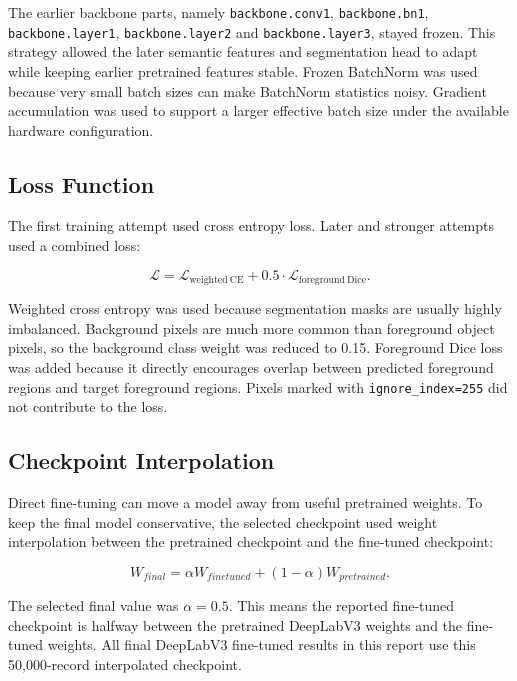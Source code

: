 \documentclass[9pt,a4paper,oneside]{rho-class/rho}
\begin{document}
    The earlier backbone parts, namely \texttt{backbone.conv1}, \texttt{backbone.bn1}, \texttt{backbone.layer1}, \texttt{backbone.layer2} and \texttt{backbone.layer3}, stayed frozen. This strategy allowed the later semantic features and segmentation head to adapt while keeping earlier pretrained features stable. Frozen BatchNorm was used because very small batch sizes can make BatchNorm statistics noisy. Gradient accumulation was used to support a larger effective batch size under the available hardware configuration.

\subsection{Loss Function}

    The first training attempt used cross entropy loss. Later and stronger attempts used a combined loss:

    \begin{equation}
        \mathcal{L} = \mathcal{L}_{\mathrm{weighted\ CE}} + 0.5 \cdot \mathcal{L}_{\mathrm{foreground\ Dice}}.
        \label{eq:loss}
    \end{equation}

    Weighted cross entropy was used because segmentation masks are usually highly imbalanced. Background pixels are much more common than foreground object pixels, so the background class weight was reduced to 0.15. Foreground Dice loss was added because it directly encourages overlap between predicted foreground regions and target foreground regions. Pixels marked with \texttt{ignore\_index=255} did not contribute to the loss.

\subsection{Checkpoint Interpolation}

    Direct fine-tuning can move a model away from useful pretrained weights. To keep the final model conservative, the selected checkpoint used weight interpolation between the pretrained checkpoint and the fine-tuned checkpoint:

    \begin{equation}
        W_{final} = \alpha W_{finetuned} + (1 - \alpha) W_{pretrained}.
        \label{eq:model-soup}
    \end{equation}

    The selected final value was \(\alpha = 0.5\). This means the reported fine-tuned checkpoint is halfway between the pretrained DeepLabV3 weights and the fine-tuned weights. All final DeepLabV3 fine-tuned results in this report use this 50,000-record interpolated checkpoint.
\end{document}
